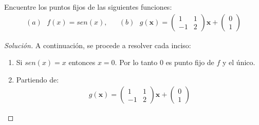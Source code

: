 \documentclass[12pt]{book}
\newenvironment{solucion}
  {\renewcommand\qedsymbol{$\square$}\begin{proof}[Solución]}
  {\end{proof}}
\begin{document}
\eje  Encuentre los puntos fijos de las siguientes funciones:
\begin{align*}
    (a)\textrm{  }f(x)= sen(x), & & (b)\textrm{  } g(\bm{x})= \begin{pmatrix}
        1&1\\
        -1&2
    \end{pmatrix}\bm{x} + \begin{pmatrix}
        0\\
        1
    \end{pmatrix}
\end{align*} 
\begin{solucion}
A continuación, se procede a resolver cada inciso:
\renewcommand{\labelenumi}{(\alph{enumi})}
\begin{enumerate}
    \item Si $sen(x)=x$ entonces $x=0$. Por lo tanto $0$ es punto fijo de $f$ y el único.
    \item Partiendo de:
    \begin{align*}
        g(\bm{x})= \begin{pmatrix}
            1&1\\
            -1&2
        \end{pmatrix}\bm{x} + \begin{pmatrix}
            0\\
            1
        \end{pmatrix}
    \end{align*}
\end{enumerate}


\end{solucion}
\end{document}
